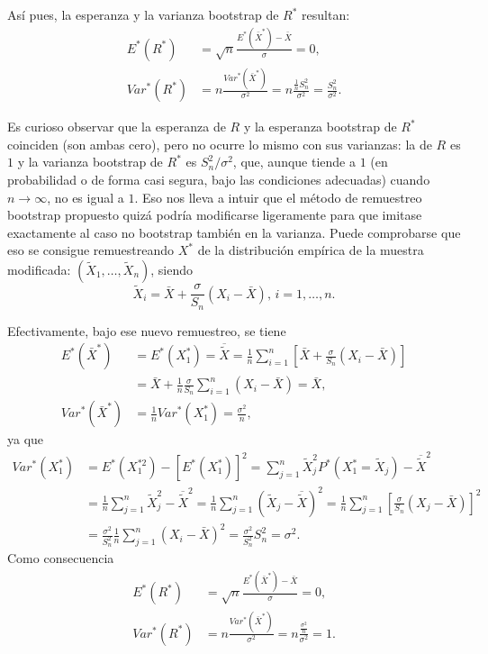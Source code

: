 \documentclass[]{book}
\theoremstyle{definition}
\theoremstyle{definition}
\theoremstyle{definition}
\theoremstyle{remark}
\begin{document}
Así pues, la esperanza y la varianza bootstrap de \(R^{\ast}\) resultan:
\[\begin{aligned}
E^{\ast}\left( R^{\ast} \right) &= \sqrt{n}\frac{E^{\ast}\left( \bar{X}^{\ast} \right) -\bar{X}}{\sigma }=0, \\
Var^{\ast}\left( R^{\ast} \right) &= n\frac{Var^{\ast}\left( \bar{X}^{\ast} \right)}{\sigma^2}=n\frac{\frac{1}{n}S_n^2}{\sigma^2}=
\frac{S_n^2}{\sigma^2}.
\end{aligned}\]

Es curioso observar que la esperanza de \(R\) y la esperanza bootstrap
de \(R^{\ast}\) coinciden (son ambas cero), pero no ocurre lo mismo con
sus varianzas: la de \(R\) es \(1\) y la varianza bootstrap de
\(R^{\ast}\) es \(S_n^2/\sigma^2\), que, aunque tiende a \(1\) (en
probabilidad o de forma casi segura, bajo las condiciones adecuadas)
cuando \(n\rightarrow \infty\), no es igual a \(1\). Eso nos lleva a
intuir que el método de remuestreo bootstrap propuesto quizá podría
modificarse ligeramente para que imitase exactamente al caso no
bootstrap también en la varianza. Puede comprobarse que eso se consigue
remuestreando \(X^{\ast}\) de la distribución empírica de la muestra
modificada: \(\left( \tilde{X}_1,\ldots ,\tilde{X}_n \right)\), siendo
\[\tilde{X}_i=\bar{X}+\frac{\sigma }{S_n}\left( X_i-\bar{X}
 \right) \text{, }i=1,\ldots ,n.\]

Efectivamente, bajo ese nuevo remuestreo, se tiene \[\begin{aligned}
E^{\ast}\left( \bar{X}^{\ast} \right) &= E^{\ast}\left( X_1^{\ast
} \right) =\overline{\tilde{X}}=\frac{1}{n}\sum_{i=1}^{n}\left[ \bar{X}+
\frac{\sigma }{S_n}\left( X_i-\bar{X} \right) \right] \\
&= \bar{X}+\frac{1}{n}\frac{\sigma }{S_n}\sum_{i=1}^{n}\left( X_i-
\bar{X} \right) =\bar{X}, \\
Var^{\ast}\left( \bar{X}^{\ast} \right) &= \frac{1}{n}Var^{\ast
}\left( X_1^{\ast} \right) =\frac{\sigma^2}{n},
\end{aligned}\] ya que \[\begin{aligned}
Var^{\ast}\left( X_1^{\ast} \right) &= E^{\ast}\left( X_1^{\ast
2} \right) -\left[ E^{\ast}\left( X_1^{\ast} \right) \right]
^2=\sum_{j=1}^{n}\tilde{X}_j^2P^{\ast}\left( X_1^{\ast}=\tilde{X}
_j \right) -\overline{\tilde{X}}^2 \\
&= \frac{1}{n}\sum_{j=1}^{n}\tilde{X}_j^2-\overline{\tilde{X}}^2=\frac{
1}{n}\sum_{j=1}^{n}\left( \tilde{X}_j-\overline{\tilde{X}} \right)^2=
\frac{1}{n}\sum_{j=1}^{n}\left[ \frac{\sigma }{S_n}\left( X_j-\bar{X} \right) \right]^2 \\
&= \frac{\sigma^2}{S_n^2}\frac{1}{n}\sum_{j=1}^{n}\left( X_i-
\bar{X} \right)^2=\frac{\sigma^2}{S_n^2}S_n^2=\sigma^2.
\end{aligned}\] Como consecuencia \[\begin{aligned}
E^{\ast}\left( R^{\ast} \right) &= \sqrt{n}\frac{E^{\ast}\left( 
\bar{X}^{\ast} \right) -\bar{X}}{\sigma }=0, \\
Var^{\ast}\left( R^{\ast} \right) &= n\frac{Var^{\ast}\left( 
\bar{X}^{\ast} \right)}{\sigma^2}=n\frac{\frac{\sigma^2}{n}}{\sigma^2}
=1.
\end{aligned}\]
\end{document}
